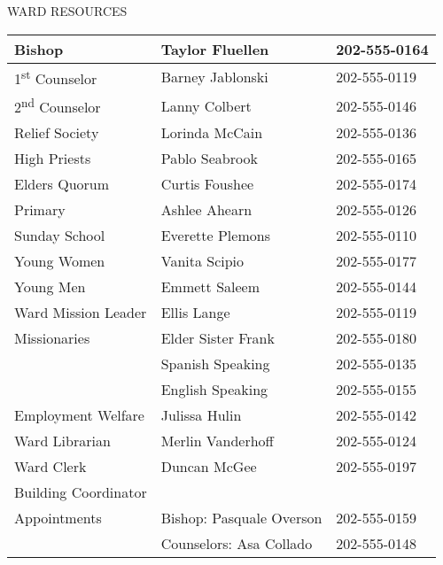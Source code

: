 \documentclass[11pt,twocolumn]{memoir}
\renewcommand\&{{\textnormal{\fontspec{Minion Pro}\itshape\amp}}}
\begin{document}
{\noindent\large\MakeUppercase{Ward Resources}}
\begin{center}
\renewcommand{\tabcolsep}{0.1in}
\vspace{-1em}
\noindent\begin{tabular}{>{\footnotesize}l >{\footnotesize}l >{\footnotesize}l}
    Bishop\hspace{8em}              & Taylor Fluellen\hspace{8em}   & 202-555-0164  \\
    \hline
    1\textsuperscript{st} Counselor & Barney Jablonski              & 202-555-0119 \\
    \hline
    2\textsuperscript{nd} Counselor & Lanny Colbert                 & 202-555-0146 \\
    \hline
    Relief Society                  & Lorinda McCain                & 202-555-0136 \\
    \hline
    High Priests                    & Pablo Seabrook                & 202-555-0165 \\
    \hline
    Elders Quorum                   & Curtis Foushee                & 202-555-0174 \\
    \hline
    Primary                         & Ashlee Ahearn                 & 202-555-0126 \\
    \hline
    Sunday School                   & Everette Plemons              & 202-555-0110 \\
    \hline
    Young Women                     & Vanita Scipio                 & 202-555-0177 \\
    \hline
    Young Men                       & Emmett Saleem                 & 202-555-0144 \\
    \hline
    Ward Mission Leader             & Ellis Lange                   & 202-555-0119 \\
    \hline
    Missionaries                    & Elder \& Sister Frank         & 202-555-0180 \\
                                    & Spanish Speaking              & 202-555-0135 \\
                                    & English Speaking              & 202-555-0155 \\
    \hline
    Employment \& Welfare           & Julissa Hulin                 & 202-555-0142 \\
    \hline
    Ward Librarian                  & Merlin Vanderhoff             & 202-555-0124 \\
    \hline
    Ward Clerk                      & Duncan McGee                  & 202-555-0197 \\
    \hline
    Building Coordinator            & \multicolumn{2}{l}{\footnotesize{Lorinda Mccain: lorinda@email.com}}\\
    \hline
    Appointments                    & Bishop: Pasquale Overson     & 202-555-0159 \\
                                    & Counselors: Asa Collado      & 202-555-0148 \\
\end{tabular}
\end{center}
\pagebreak
\end{document}
